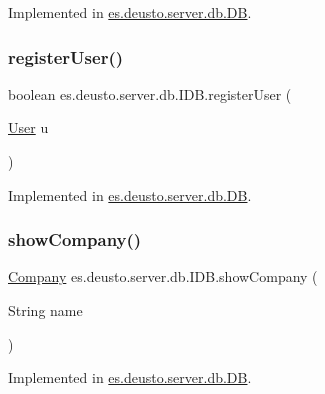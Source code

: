 Implemented in \hyperlink{classes_1_1deusto_1_1server_1_1db_1_1_d_b_a1c471589284782e7ff1190f2b6c2369e}{es.\+deusto.\+server.\+db.\+DB}.

\mbox{\label{interfacees_1_1deusto_1_1server_1_1db_1_1_i_d_b_ad9ecf628cb97ade7cb1b10fd1b3a18c4}} 
\subsubsection{\texorpdfstring{register\+User()}{registerUser()}}
{\footnotesize\ttfamily boolean es.\+deusto.\+server.\+db.\+I\+D\+B.\+register\+User (\begin{DoxyParamCaption}\item[{\hyperlink{classes_1_1deusto_1_1server_1_1db_1_1data_1_1_user}{User}}]{u }\end{DoxyParamCaption})}



Implemented in \hyperlink{classes_1_1deusto_1_1server_1_1db_1_1_d_b_a888f468b3fc2a05520fca9ac135823e3}{es.\+deusto.\+server.\+db.\+DB}.

\mbox{\label{interfacees_1_1deusto_1_1server_1_1db_1_1_i_d_b_a1681e29b5fbe4377b19e67fa939b2782}} 
\subsubsection{\texorpdfstring{show\+Company()}{showCompany()}}
{\footnotesize\ttfamily \hyperlink{classes_1_1deusto_1_1server_1_1db_1_1data_1_1_company}{Company} es.\+deusto.\+server.\+db.\+I\+D\+B.\+show\+Company (\begin{DoxyParamCaption}\item[{String}]{name }\end{DoxyParamCaption})}



Implemented in \hyperlink{classes_1_1deusto_1_1server_1_1db_1_1_d_b_ab5edf3ae158bb0501a882b1d724cc2a8}{es.\+deusto.\+server.\+db.\+DB}.

